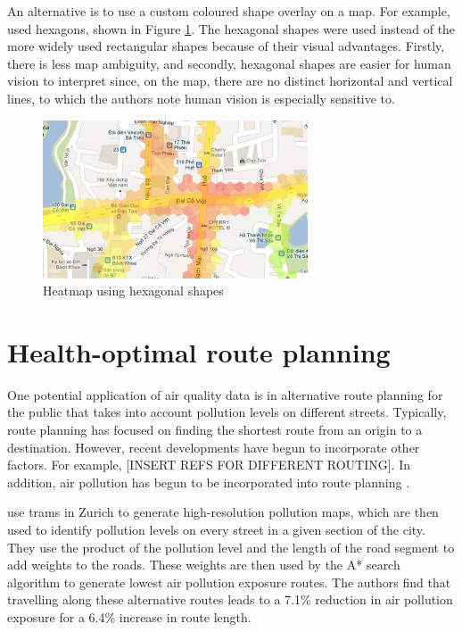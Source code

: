\documentclass[11pt]{report}
\begin{document}
An alternative is to use a custom coloured shape overlay on a map. For example, \cite{Hoang2013hanoihexagons} used hexagons, shown in Figure \ref{hanoihexagons}. The hexagonal shapes were used instead of the more widely used rectangular shapes because of their visual advantages. Firstly, there is less map ambiguity, and secondly, hexagonal shapes are easier for human vision to interpret since, on the map, there are no distinct horizontal and vertical lines, to which the authors note human vision is especially sensitive to. 

\begin{figure}[!htb]
\centering
\includegraphics[width=0.7\textwidth]{hanoihexagons}
\caption{Heatmap using hexagonal shapes \citep{Hoang2013hanoihexagons}}
\label{hanoihexagons}
\end{figure}

\section{Health-optimal route planning}

One potential application of air quality data is in alternative route planning for the public that takes into account pollution levels on different streets. Typically, route planning has focused on finding the shortest route from an origin to a destination. However, recent developments have begun to incorporate other factors. For example, [INSERT REFS FOR DIFFERENT ROUTING]. In addition, air pollution has begun to be incorporated into route planning \citep{sharker2014exposureroutes, Hasenfratz2015highresmapsTram}.

\cite{Hasenfratz2015highresmapsTram} use trams in Zurich to generate high-resolution pollution maps, which are then used to identify pollution levels on every street in a given section of the city. They use the product of the pollution level and the length of the road segment to add weights to the roads. These weights are then used by the A* search algorithm to generate lowest air pollution exposure routes. The authors find that travelling along these alternative routes leads to a 7.1\% reduction in air pollution exposure for a 6.4\% increase in route length.
\end{document}
